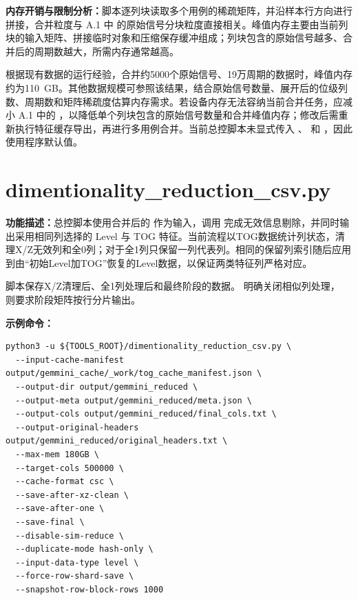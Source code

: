 \textbf{内存开销与限制分析：}脚本逐列块读取多个用例的稀疏矩阵，并沿样本行方向进行拼接，合并粒度与 A.1 中  的原始信号分块粒度直接相关。峰值内存主要由当前列块的输入矩阵、拼接临时对象和压缩保存缓冲组成；列块包含的原始信号越多、合并后的周期数越大，所需内存通常越高。

根据现有数据的运行经验，合并约5000个原始信号、19万周期的数据时，峰值内存约为110~GB。其他数据规模可参照该结果，结合原始信号数量、展开后的位级列数、周期数和矩阵稀疏度估算内存需求。若设备内存无法容纳当前合并任务，应减小 A.1 中的 ，以降低单个列块包含的原始信号数量和合并峰值内存；修改后需重新执行特征缓存导出，再进行多用例合并。当前总控脚本未显式传入 、 和 ，因此使用程序默认值。


\section{dimentionality\_reduction\_csv.py}

\textbf{功能描述：}总控脚本使用合并后的  作为输入，调用  完成无效信息剔除，并同时输出采用相同列选择的 Level 与 TOG 特征。当前流程以TOG数据统计列状态，清理X/Z无效列和全0列；对于全1列只保留一列代表列。相同的保留列索引随后应用到由“初始Level加TOG”恢复的Level数据，以保证两类特征列严格对应。

脚本保存X/Z清理后、全1列处理后和最终阶段的数据。 明确关闭相似列处理， 则要求阶段矩阵按行分片输出。

\textbf{示例命令：}
\begin{lstlisting}
python3 -u ${TOOLS_ROOT}/dimentionality_reduction_csv.py \
  --input-cache-manifest output/gemmini_cache/_work/tog_cache_manifest.json \
  --output-dir output/gemmini_reduced \
  --output-meta output/gemmini_reduced/meta.json \
  --output-cols output/gemmini_reduced/final_cols.txt \
  --output-original-headers output/gemmini_reduced/original_headers.txt \
  --max-mem 180GB \
  --target-cols 500000 \
  --cache-format csc \
  --save-after-xz-clean \
  --save-after-one \
  --save-final \
  --disable-sim-reduce \
  --duplicate-mode hash-only \
  --input-data-type level \
  --force-row-shard-save \
  --snapshot-row-block-rows 1000
\end{lstlisting}

